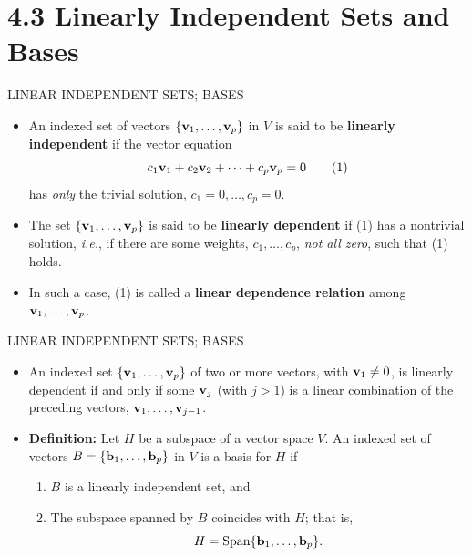 \section[4.3 Bases]{4.3 Linearly Independent Sets and Bases}

\begin{frame}[shrink=13]{LINEAR INDEPENDENT SETS; BASES}
\begin{itemize}
\item An indexed set of vectors $\{\mathbf{v}_1,\ldots,\mathbf{v}_p\}$ in $V$ is said to be \textbf{linearly independent} if the vector equation
\[
c_1\mathbf{v}_1+c_2\mathbf{v}_2+\cdots+c_p\mathbf{v}_p=0 \tag{1}
\]
has \emph{only} the trivial solution, $c_1=0,\ldots,c_p=0$.
\item The set $\{\mathbf{v}_1,\ldots,\mathbf{v}_p\}$ is said to be \textbf{linearly dependent} if (1) has a nontrivial solution, \emph{i.e.}, if there are some weights, $c_1,\ldots,c_p$, \emph{not all zero}, such that (1) holds.
\item In such a case, (1) is called a \textbf{linear dependence relation} among $\mathbf{v}_1,\ldots,\mathbf{v}_p$.
\end{itemize}
\end{frame}

\begin{frame}[shrink=16]{LINEAR INDEPENDENT SETS; BASES}
\begin{itemize}
\item {} An indexed set $\{\mathbf{v}_1,\ldots,\mathbf{v}_p\}$ of two or more vectors, with $\mathbf{v}_1\ne0$, is linearly dependent if and only if some $\mathbf{v}_j$ (with $j>1$) is a linear combination of the preceding vectors, $\mathbf{v}_1,\ldots,\mathbf{v}_{j-1}$.
\item \textbf{Definition:} Let $H$ be a subspace of a vector space $V$. An indexed set of vectors $B=\{\mathbf{b}_1,\ldots,\mathbf{b}_p\}$ in $V$ is a basis for $H$ if
\begin{enumerate}
\item[(i)] $B$ is a linearly independent set, and
\item[(ii)] The subspace spanned by $B$ coincides with $H$; that is,
\[
H=\operatorname{Span}\{\mathbf{b}_1,\ldots,\mathbf{b}_p\}.
\]
\end{enumerate}
\end{itemize}
\end{frame}

